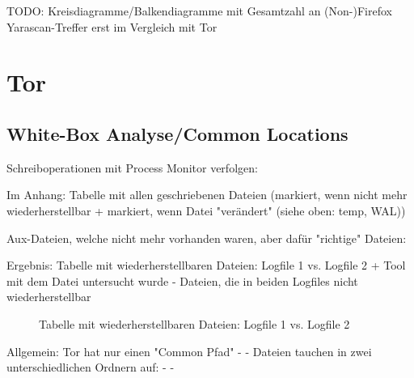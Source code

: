 TODO: Kreisdiagramme/Balkendiagramme mit Gesamtzahl an (Non-)Firefox Yarascan-Treffer erst im Vergleich mit Tor

\newpage




\section{Tor}

\subsection*{White-Box Analyse/Common Locations}

Schreiboperationen mit Process Monitor verfolgen:

Im Anhang: Tabelle mit allen geschriebenen Dateien (markiert, wenn nicht mehr wiederherstellbar + markiert, wenn Datei "verändert" (siehe oben: temp, WAL))

Aux-Dateien, welche nicht mehr vorhanden waren, aber dafür "richtige" Dateien:

Ergebnis: Tabelle mit wiederherstellbaren Dateien: Logfile 1 vs. Logfile 2 + Tool mit dem Datei untersucht wurde
- Dateien, die in beiden Logfiles nicht wiederherstellbar 
\begin{figure}[h!]
	\caption{Tabelle mit wiederherstellbaren Dateien: Logfile 1 vs. Logfile 2}
\end{figure}

Allgemein: Tor hat nur einen "Common Pfad"
-	%
- Dateien tauchen in zwei unterschiedlichen Ordnern auf:
	- %
	- %

